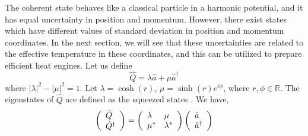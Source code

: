 \documentclass[12pt, twoside]{article}
\begin{document}
The coherent state behaves like a classical particle in a harmonic potential, and it has equal uncertainty in position and momentum. However, there exist states which have different values of standard deviation in position and momentum coordinates. In the next section, we will see that these uncertainties are related to the effective temperature in these coordinates, and this can be utilized to prepare efficient heat engines. Let us define \begin{equation} \label{eq:squeeze}
\hat{Q} = \lambda \hat{a} + \mu \hat{a}^\dagger
\end{equation} where $|\lambda|^2 - |\mu|^2 = 1$. Let $\lambda = \cosh(r)$, $\mu = \sinh(r)e^{i\phi}$, where $r,\phi \in \mathbb{R}$. The eigenstates of $\hat{Q}$ are defined as the squeezed states \cite{squeezed_reference}.
 We have,
 \[  \left( \begin{array} { l } { \hat { Q } } \\ { \hat { Q } ^ { \dagger } } \end{array} \right) = \left( \begin{array} { l l } { \lambda } & { \mu } \\ { \mu ^ { * } } & { \lambda ^ { * } } \end{array} \right) \left( \begin{array} { l } { \hat{a} } \\ { \hat{a}^\dagger } \end{array} \right)\]
 
\end{document}
